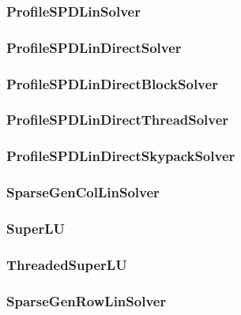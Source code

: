 \pagebreak
\subsubsection{{\bf ProfileSPDLinSolver}}


\pagebreak
\subsubsection{ProfileSPDLinDirectSolver}


\pagebreak
\subsubsection{ProfileSPDLinDirectBlockSolver}


\pagebreak
\subsubsection{ProfileSPDLinDirectThreadSolver}


\pagebreak
\subsubsection{ProfileSPDLinDirectSkypackSolver}


\pagebreak
\subsubsection{{\bf SparseGenColLinSolver}}


\pagebreak
\subsubsection{SuperLU}


\pagebreak
\subsubsection{ThreadedSuperLU}
%

\pagebreak
\subsubsection{{\bf SparseGenRowLinSolver}}
%

